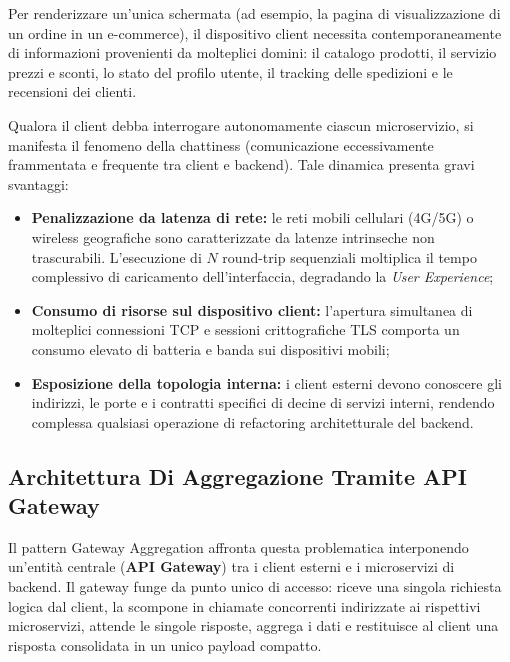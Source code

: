 \documentclass[11pt, a4paper]{article}
\begin{document}
Per renderizzare un'unica schermata (ad esempio, la pagina di visualizzazione di un ordine in un e-commerce), il dispositivo client necessita contemporaneamente di informazioni provenienti da molteplici domini: il catalogo prodotti, il servizio prezzi e sconti, lo stato del profilo utente, il tracking delle spedizioni e le recensioni dei clienti.

Qualora il client debba interrogare autonomamente ciascun microservizio, si manifesta il fenomeno della chattiness (comunicazione eccessivamente frammentata e frequente tra client e backend). Tale dinamica presenta gravi svantaggi:
\begin{itemize}[noitemsep]
    \item \textbf{Penalizzazione da latenza di rete:} le reti mobili cellulari (4G/5G) o wireless geografiche sono caratterizzate da latenze intrinseche non trascurabili. L'esecuzione di $N$ round-trip sequenziali moltiplica il tempo complessivo di caricamento dell'interfaccia, degradando la \emph{User Experience};
    \item \textbf{Consumo di risorse sul dispositivo client:} l'apertura simultanea di molteplici connessioni TCP e sessioni crittografiche TLS comporta un consumo elevato di batteria e banda sui dispositivi mobili;
    \item \textbf{Esposizione della topologia interna:} i client esterni devono conoscere gli indirizzi, le porte e i contratti specifici di decine di servizi interni, rendendo complessa qualsiasi operazione di refactoring architetturale del backend.
\end{itemize}

\subsection{Architettura Di Aggregazione Tramite API Gateway}

Il pattern Gateway Aggregation affronta questa problematica interponendo un'entità centrale (\textbf{API Gateway}) tra i client esterni e i microservizi di backend. Il gateway funge da punto unico di accesso: riceve una singola richiesta logica dal client, la scompone in chiamate concorrenti indirizzate ai rispettivi microservizi, attende le singole risposte, aggrega i dati e restituisce al client una risposta consolidata in un unico payload compatto.
\end{document}
